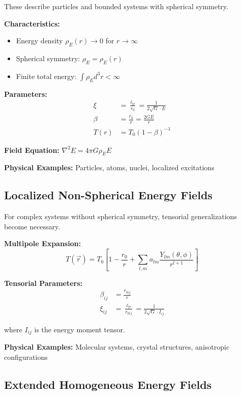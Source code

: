 \documentclass[12pt,a4paper]{report}
\newcommand{\lP}{\ell_{\text{P}}}         %
\newcommand{\rzero}{r_0}                  %
\begin{document}
	These describe particles and bounded systems with spherical symmetry.
	
	\textbf{Characteristics:}
	\begin{itemize}
		\item Energy density $\rho_E(r) \to 0$ for $r \to \infty$
		\item Spherical symmetry: $\rho_E = \rho_E(r)$
		\item Finite total energy: $\int \rho_E d^3r < \infty$
	\end{itemize}
	
	\textbf{Parameters:}
	\begin{align}
		\xi &= \frac{\lP}{\rzero} = \frac{1}{2\sqrt{G} \cdot E} \\
		\beta &= \frac{\rzero}{r} = \frac{2GE}{r} \\
		T(r) &= T_0(1 - \beta)^{-1}
	\end{align}
	
	\textbf{Field Equation:} $\nabla^2 E = 4\pi G \rho_E E$
	
	\textbf{Physical Examples:} Particles, atoms, nuclei, localized excitations
	
	\subsection{Localized Non-Spherical Energy Fields}
	\label{subsec:localized_nonsphere}
	
	For complex systems without spherical symmetry, tensorial generalizations become necessary.
	
	\textbf{Multipole Expansion:}
	\begin{equation}
		T(\vec{r}) = T_0\left[1 - \frac{\rzero}{r} + \sum_{l,m} a_{lm} \frac{Y_{lm}(\theta,\phi)}{r^{l+1}}\right]
		\label{eq:multipole_expansion}
	\end{equation}
	
	\textbf{Tensorial Parameters:}
	\begin{align}
		\beta_{ij} &= \frac{r_{0ij}}{r} \\
		\xi_{ij} &= \frac{\lP}{r_{0ij}} = \frac{1}{2\sqrt{G} \cdot I_{ij}}
	\end{align}
	
	where $I_{ij}$ is the energy moment tensor.
	
	\textbf{Physical Examples:} Molecular systems, crystal structures, anisotropic configurations
	
	\subsection{Extended Homogeneous Energy Fields}
	\label{subsec:extended_homogeneous}
	
\end{document}
